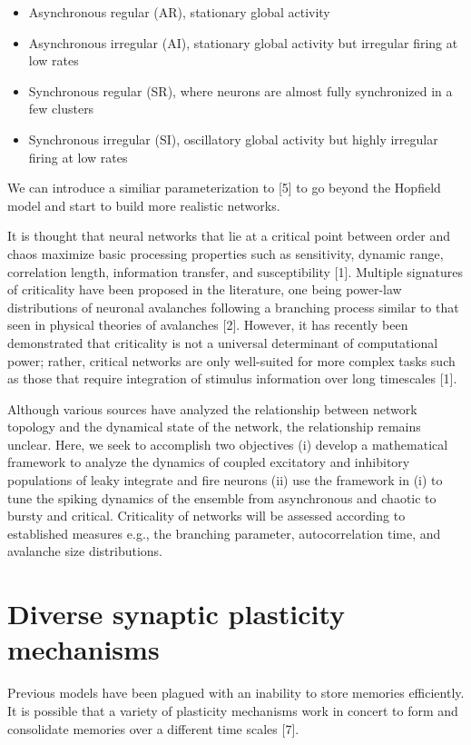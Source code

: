 \documentclass{article} %
\begin{document}
\begin{itemize}
  \item Asynchronous regular (AR), stationary global activity
  \item Asynchronous irregular (AI), stationary global activity but irregular firing at low rates
  \item Synchronous regular (SR), where neurons are almost fully synchronized in a few clusters
  \item Synchronous irregular (SI), oscillatory global activity but highly irregular firing at low rates
\end{itemize}

We can introduce a similiar parameterization to [5] to go beyond the Hopfield model and start to build more realistic networks. 


It is thought that neural networks that lie at a critical point between order and chaos maximize basic processing properties such as sensitivity, dynamic range, correlation length, information transfer, and susceptibility [1]. Multiple signatures of criticality have been proposed in the literature, one being power-law distributions of neuronal avalanches following a branching process similar to that seen in physical theories of avalanches [2]. However, it has recently been demonstrated that criticality is not a universal determinant of computational power; rather, critical networks are only well-suited for more complex tasks such as those that require integration of stimulus information over long timescales [1]. 

Although various sources have analyzed the relationship between network topology and the dynamical state of the network, the relationship remains unclear. Here, we seek to accomplish two objectives (i) develop a mathematical framework to analyze the dynamics of coupled excitatory and inhibitory populations of leaky integrate and fire neurons (ii) use the framework in (i) to tune the spiking dynamics of the ensemble from asynchronous and chaotic to bursty and critical. Criticality of networks will be assessed according to established measures e.g., the branching parameter, autocorrelation time, and avalanche size distributions. 

\section{Diverse synaptic plasticity mechanisms}

Previous models have been plagued with an inability to store memories efficiently. It is possible that a variety of plasticity mechanisms work in concert to form and consolidate memories over a different time scales [7].
\end{document}
